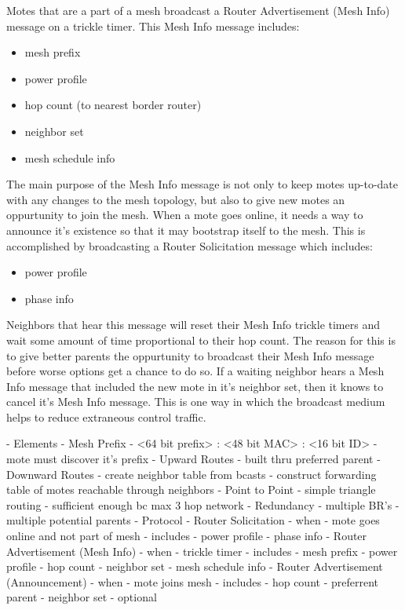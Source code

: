 Motes that are a part of a mesh broadcast a Router Advertisement (Mesh Info) message on a trickle timer. 
This Mesh Info message includes:
\begin{itemize}
\item mesh prefix
\item power profile
\item hop count (to nearest border router)
\item neighbor set
\item mesh schedule info
\end{itemize}
The main purpose of the Mesh Info message is not only to keep motes up-to-date with any changes to the mesh topology, but also to give new motes an oppurtunity to join the mesh.
When a mote goes online, it needs a way to announce it's existence so that it may bootstrap itself to the mesh. 
This is accomplished by broadcasting a Router Solicitation message which includes: 
\begin{itemize}
\item power profile
\item phase info
\end{itemize}
Neighbors that hear this message will reset their Mesh Info trickle timers and wait some amount of time proportional to their hop count. 
The reason for this is to give better parents the oppurtunity to broadcast their Mesh Info message before worse options get a chance to do so.
If a waiting neighbor hears a Mesh Info message that included the new mote in it's neighbor set, then it knows to cancel it's Mesh Info message.
This is one way in which the broadcast medium helps to reduce extraneous control traffic. 



- Elements
    - Mesh Prefix
        - <64 bit prefix> : <48 bit MAC> : <16 bit ID>
        - mote must discover it's prefix
    - Upward Routes
        - built thru preferred parent
    - Downward Routes
        - create neighbor table from bcasts
        - construct forwarding table of motes reachable through neighbors
    - Point to Point
        - simple triangle routing
        - sufficient enough bc max 3 hop network
    - Redundancy
        - multiple BR's
        - multiple potential parents
- Protocol
    - Router Solicitation
        - when
            - mote goes online and not part of mesh
        - includes
            - power profile
            - phase info
    - Router Advertisement (Mesh Info)
        - when
            - trickle timer
        - includes
            - mesh prefix
            - power profile
            - hop count
            - neighbor set
            - mesh schedule info
    - Router Advertisement (Announcement)
        - when
            - mote joins mesh
        - includes
            - hop count
            - preferrent parent
            - neighbor set
        - optional
\fi

